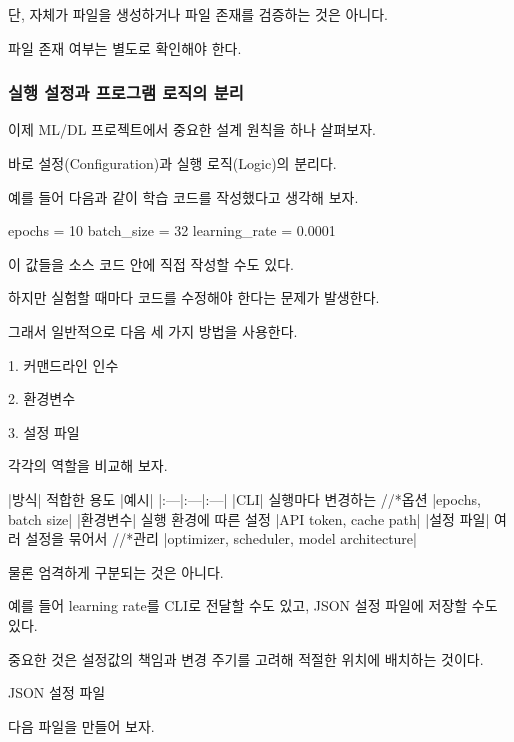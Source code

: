 단,  자체가 파일을 생성하거나 파일 존재를 검증하는 것은 아니다.

파일 존재 여부는 별도로 확인해야 한다.

\subsubsection{실행 설정과 프로그램 로직의 분리}

이제 ML/DL 프로젝트에서 중요한 설계 원칙을 하나 살펴보자.

바로 설정(Configuration)과 실행 로직(Logic)의 분리다.

예를 들어 다음과 같이 학습 코드를 작성했다고 생각해 보자.

\begin{dhkzsh}
epochs = 10
batch_size = 32
learning_rate = 0.0001
\end{dhkzsh}

이 값들을 소스 코드 안에 직접 작성할 수도 있다.

하지만 실험할 때마다 코드를 수정해야 한다는 문제가 발생한다.

그래서 일반적으로 다음 세 가지 방법을 사용한다.

\begin{dhksmry}
    1. 커맨드라인 인수

    2. 환경변수

    3. 설정 파일
\end{dhksmry}

각각의 역할을 비교해 보자.

\begin{dhktable}
|방식|	적합한 용도	|예시|
|:---|:---|:---|
|CLI|	실행마다 변경하는 //*옵션	|epochs, batch size|
|환경변수|	실행 환경에 따른 설정	|API token, cache path|
|설정 파일|	여러 설정을 묶어서 //*관리	|optimizer, scheduler, model architecture|
\end{dhktable}

물론 엄격하게 구분되는 것은 아니다.

예를 들어 learning rate를 CLI로 전달할 수도 있고, JSON 설정 파일에 저장할 수도 있다.

중요한 것은 설정값의 책임과 변경 주기를 고려해 적절한 위치에 배치하는 것이다.

\begin{dhknote}
\begin{dhksmry}[centered]
JSON 설정 파일
\end{dhksmry}
\end{dhknote}

다음 파일을 만들어 보자.

